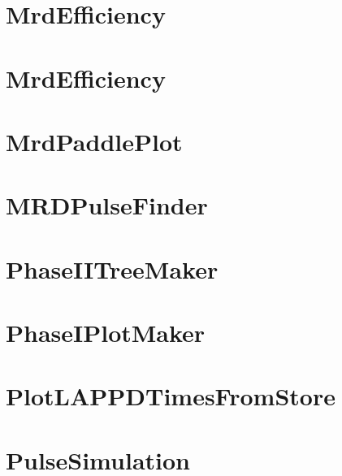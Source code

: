 \documentclass[twoside]{book}
\begin{document}
\chapter{Mrd\-Efficiency}
\label{md_UserTools_MrdDistributions_README}
\hypertarget{md_UserTools_MrdDistributions_README}{}

\chapter{Mrd\-Efficiency}
\label{md_UserTools_MrdEfficiency_README}
\hypertarget{md_UserTools_MrdEfficiency_README}{}

\chapter{Mrd\-Paddle\-Plot}
\label{md_UserTools_MrdPaddlePlot_README}
\hypertarget{md_UserTools_MrdPaddlePlot_README}{}

\chapter{M\-R\-D\-Pulse\-Finder}
\label{md_UserTools_MRDPulseFinder_README}
\hypertarget{md_UserTools_MRDPulseFinder_README}{}

\chapter{Phase\-I\-I\-Tree\-Maker}
\label{md_UserTools_PhaseIITreeMaker_README}
\hypertarget{md_UserTools_PhaseIITreeMaker_README}{}

\chapter{Phase\-I\-Plot\-Maker}
\label{md_UserTools_PhaseITreeMaker_README}
\hypertarget{md_UserTools_PhaseITreeMaker_README}{}

\chapter{Plot\-L\-A\-P\-P\-D\-Times\-From\-Store}
\label{md_UserTools_PlotLAPPDTimesFromStore_README}
\hypertarget{md_UserTools_PlotLAPPDTimesFromStore_README}{}

\chapter{Pulse\-Simulation}
\label{md_UserTools_PulseSimulation_README}
\hypertarget{md_UserTools_PulseSimulation_README}{}

\end{document}
